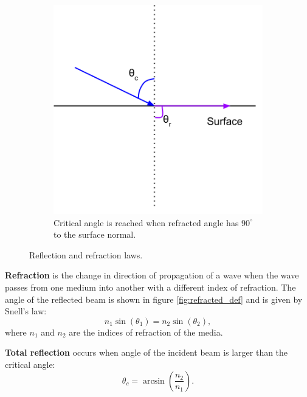 \begin{figure}
		    \begin{subfigure}[t]{0.5\textwidth}
		        \includegraphics[width=\textwidth]{images/total_reflection.png}
		        \caption{Critical angle is reached when refracted angle has $90^\circ$ to the surface normal.}
		        \label{fig:total_reflected_def}
		    \end{subfigure}
		    \caption{Reflection and refraction laws.}
	 		\end{figure}	
			
			\textbf{Refraction} is the change in direction of propagation of a wave when the wave passes from one medium into another with a different index of refraction. The angle of the reflected beam is shown in figure \ref{fig:refracted_def} and is given by Snell's law:
			\begin{equation}
				n_1 \sin(\theta_1) = n_2 \sin(\theta_2),
			\end{equation}
				where $n_1$ and $n_2$ are the indices of refraction of the media.
				
				\textbf{Total reflection} occurs when angle of the incident beam is larger than the critical angle:
				\begin{equation}
					\theta_c = \arcsin\left(\dfrac{n_2}{n_1}\right).
				\end{equation}
				
				
